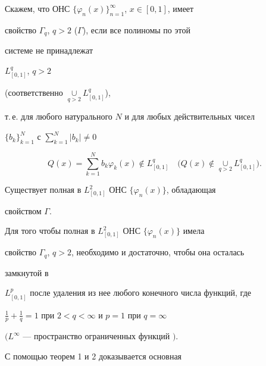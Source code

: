 \begin{defn} 


Скажем, что ОНС $\{\varphi_n(x)\}^\infty_{n=1}$, $x\in[0,1]$, имеет 


свойство $\Gamma_q$, $q>2$ ($\Gamma$), если все полиномы по этой 


системе не принадлежат 


$L^q_{[0,1]}$, $q>2$


(соответственно $\mathop{\cup}\limits_{q>2}L^q_{[0,1]}$), 


т.\,е. для любого натурального $N$ и для любых действительных чисел 


$\{b_k\}^N_{k=1}$ с $\sum\limits^N_{k=1}|b_k|\ne0$ 


$$ 


Q(x)=\sum^N_{k=1}b_k\varphi_k(x)\notin L^q_{[0,1]}\quad 


\Big(Q(x)\notin\underset{q>2}{\cup}{} 


L^q_{[0,1]}\Big). 


$$ 


\end{defn} 


 


\begin{thm} 


Существует полная в $L^2_{[0,1]}$ ОНС $\{\varphi_n(x)\}$, обладающая 


свойством $\Gamma$. 


\end{thm} 


 


\begin{thm} 


Для того чтобы полная в $L^2_{[0,1]}$ ОНС $\{\varphi_n(x)\}$ имела 


свойство $\Gamma_q$, $q>2$, необходимо и достаточно, чтобы она осталась 


замкнутой в 


$L^p_{[0,1]}$ после удаления из нее любого конечного числа функций, где 


$\frac{1}{p}+\frac{1}{q}=1$ при $2<q<\infty$ и $p=1$ при $q=\infty$ 


$(L^\infty$ --- пространство ограниченных функций $)$. 


\end{thm} 


 


С помощью теорем 1 и 2 доказывается основная 


